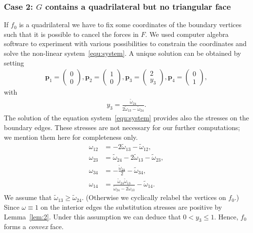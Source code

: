 \documentclass{article}
\theoremstyle{plain} \newtheorem{thm}{Theorem}[section]
\newcommand{\ot}{\tilde{\omega}}
\begin{document}
\subsubsection*{Case 2: $G$ contains a quadrilateral but no triangular face}\label{sec:case2}
If $f_0$ is a quadrilateral we have to fix some 
coordinates of the boundary vertices such that
it is possible to cancel the forces in $F$. 
We used computer algebra software to experiment with various
possibilities to constrain the coordinates and solve the non-linear
system~\eqref{equ:system}.
A unique solution can be obtained by setting 
\begin{align}\label{equ:4goncoordinates}
\mathbf{p}_1= \begin{pmatrix}0 \\  0\end{pmatrix},
 \mathbf{p}_2= \begin{pmatrix}1 \\  0\end{pmatrix},
 \mathbf{p}_3= \begin{pmatrix}2 \\ y_3 \end{pmatrix},
 \mathbf{p}_4= \begin{pmatrix}0 \\ 1 \end{pmatrix},
\end{align}
with
\begin{align}
y_3 = \frac{\ot_{24}}{2\ot_{13}-\ot_{24}}.
\label{equ:sol4}
\end{align}
The solution of the equation system~\eqref{equ:system} provides also the stresses on the boundary edges. These stresses are not necessary for our further computations; we mention them here for completeness only.
\begin{equation}
\begin{split}
\omega_{12}& =  -2\ot_{13}-\ot_{12}, \\
\omega_{23}& =  \ot_{24}-2\ot_{13}-\ot_{23}, \\
\omega_{34}& =  -\frac{\ot_{24}}{2}-\ot_{34}, \\
\omega_{14}& =  \frac{\ot_{24}\ot_{13}}{\ot_{24}-2\ot_{13}}-\ot_{14}.
\end{split}
\label{equ:sol4-2}
\end{equation}
We assume that $\ot_{13}\geq\ot_{24}$.
(Otherwise we cyclically relabel the vertices on $f_0$.) 
Since $\omega\equiv 1$ on the interior edges the substitution stresses are positive by Lemma~\ref{lem:2}. Under this assumption we can deduce that $0<y_3\leq 1$. Hence,  $f_0$ forms a \emph{convex} face.
\end{document}
